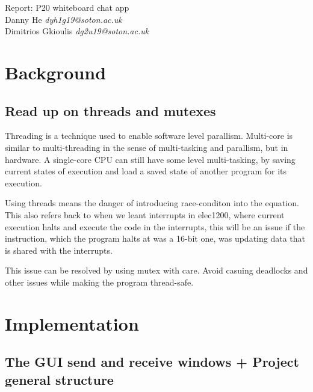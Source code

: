 \documentclass[11pt]{article}
\author{danny}
\date{\today}
\newcommand{\docTitle}{Report: P20 whiteboard chat app}
\newcommand{\docAuthor}{Danny He\\Dimitrios Gkioulis}
\begin{document}
{
    \centering
    \fontsize{28pt}{29.4pt} \selectfont
    \docTitle\\
    \vspace{25pt}
    \fontsize{10pt}{10.5pt}\selectfont
    {Danny He} \textit{dyh1g19@soton.ac.uk} \\ %
    {Dimitrios Gkioulis} \textit{dg2u19@soton.ac.uk} \\
}

\tableofcontents

\newpage

\begin{multicols*}{2}
\section{Background}

\subsection{Read up on threads and mutexes}

Threading is a technique used to enable software level parallism. Multi-core is similar to multi-threading in the sense of multi-tasking and parallism, but in hardware. A single-core CPU can still have some level multi-tasking, by saving current states of execution and load a saved state of another program for its execution.

Using threads means the danger of introducing race-conditon into the equation. This also refers back to when we leant interrupts in elec1200, where current execution halts and execute the code in the interrupts, this will be an issue if the instruction, which the program halts at was a 16-bit one, was updating data that is shared with the interrupts.

This issue can be resolved by using mutex with care. Avoid casuing deadlocks and other issues while making the program thread-safe.

\section{Implementation}

\subsection{The GUI send and receive windows + Project general structure}


\end{multicols*}
\end{document}
